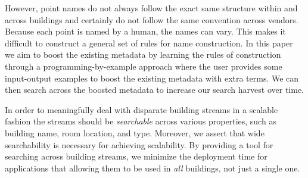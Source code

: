 However, point names do not always follow the exact same structure within and across
buildings and certainly do not 
follow the same convention across vendors.  Because each
point is named by a human, the names can vary. This makes it difficult to construct a general
set of rules for name construction.  In this paper we aim to boost the existing 
metadata by learning the rules of construction through a programming-by-example
approach where the user provides some input-output examples to boost the existing
metadata with extra terms.  We can then search across the boosted metadata to increase
our search harvest over time.

In order to meaningfully deal with disparate building streams in a scalable 
fashion the streams should be \emph{searchable} across various properties, such
as building name, room location, and type.  Moreover, we
assert that wide searchability is necessary for achieving scalability.  By providing a tool for
searching across building streams, we minimize the deployment time for applications that 
allowing them to be used in \emph{all} buildings, not just a single one.  




